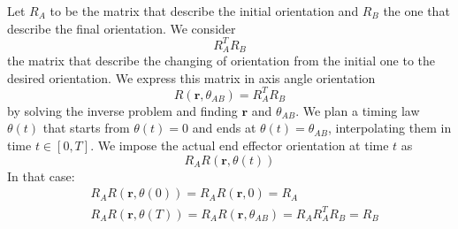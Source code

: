 \documentclass[10pt, letterpaper]{report}
\begin{document}
Let $R_A$ to be the matrix that describe the initial orientation and $R_B$ the one that describe the final orientation. We consider \begin{equation}
    R_A^TR_B 
\end{equation}
the matrix that describe the changing of orientation from the initial one to the desired orientation.
We express this matrix in axis angle orientation \begin{equation}
    R(\mathbf r,\theta_{AB})= R_A^TR_B 
\end{equation}
by solving the inverse problem and finding $\mathbf r$ and $\theta_{AB}$. We plan a timing law $\theta(t)$ that starts from $\theta(t)=0$ and ends at $\theta(t)=\theta_{AB}$, interpolating them in time $t\in[0,T]$. We impose the actual end effector orientation at time $t$ as\begin{equation}
    R_AR(\mathbf r,\theta(t))
\end{equation}
In that case:\begin{align}
    &R_AR(\mathbf r,\theta(0))=R_AR(\mathbf r,0)=R_A\\
    &R_AR(\mathbf r,\theta(T))=R_AR(\mathbf r,\theta_{AB})=R_AR_A^TR_B =R_B
\end{align}
\end{document}
